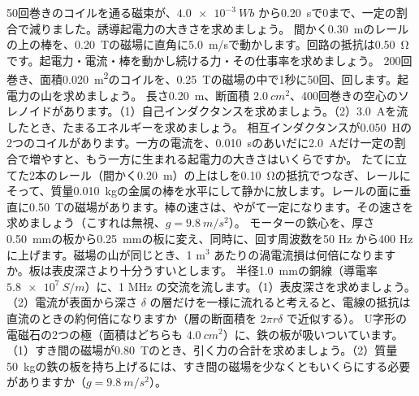 \bkendproblems
{}
\bkproblem 50回巻きのコイルを通る磁束が、$\qty{4.0e-3}{Wb}$ から\qty{0.20}{s}で0まで、一定の割合で減りました。誘導起電力の大きさを求めましょう。
\bkproblem 間かく\qty{0.30}{m}のレールの上の棒を、\qty{0.20}{T}の磁場に直角に\qty{5.0}{m/s}で動かします。回路の抵抗は\qty{0.50}{\ohm}です。起電力・電流・棒を動かし続ける力・その仕事率を求めましょう。
\bkproblem 200回巻き、面積\qty{0.020}{m^2}のコイルを、\qty{0.25}{T}の磁場の中で1秒に50回、回します。起電力の山を求めましょう。
\bkproblem 長さ\qty{0.20}{m}、断面積 $\qty{2.0}{cm^2}$、400回巻きの空心のソレノイドがあります。（1）自己インダクタンスを求めましょう。（2）\qty{3.0}{A}を流したとき、たまるエネルギーを求めましょう。
\bkproblem 相互インダクタンスが\qty{0.050}{H}の2つのコイルがあります。一方の電流を、\qty{0.010}{s}のあいだに\qty{2.0}{A}だけ一定の割合で増やすと、もう一方に生まれる起電力の大きさはいくらですか。
\bkproblem たてに立てた2本のレール（間かく\qty{0.20}{m}）の上はしを\qty{0.10}{\ohm}の抵抗でつなぎ、レールにそって、質量\qty{0.010}{kg}の金属の棒を水平にして静かに放します。レールの面に垂直に\qty{0.50}{T}の磁場があります。棒の速さは、やがて一定になります。その速さを求めましょう（こすれは無視、$g=\qty{9.8}{m/s^2}$）。
\bkproblem モーターの鉄心を、厚さ\qty{0.50}{mm}の板から\qty{0.25}{mm}の板に変え、同時に、回す周波数を50 Hz から400 Hz に上げます。磁場の山が同じとき、1 m$^3$ あたりの渦電流損は何倍になりますか。板は表皮深さより十分うすいとします。
\bkproblem 半径\qty{1.0}{mm}の銅線（導電率 $\qty{5.8e7}{S/m}$）に、1 MHz の交流を流します。（1）表皮深さを求めましょう。（2）電流が表面から深さ $\delta$ の層だけを一様に流れると考えると、電線の抵抗は直流のときの約何倍になりますか（層の断面積を $2\pi r\delta$ で近似する）。
\bkproblem U字形の電磁石の2つの極（面積はどちらも $\qty{4.0}{cm^2}$）に、鉄の板が吸いついています。（1）すき間の磁場が\qty{0.80}{T}のとき、引く力の合計を求めましょう。（2）質量\qty{50}{kg}の鉄の板を持ち上げるには、すき間の磁場を少なくともいくらにする必要がありますか（$g=\qty{9.8}{m/s^2}$）。


